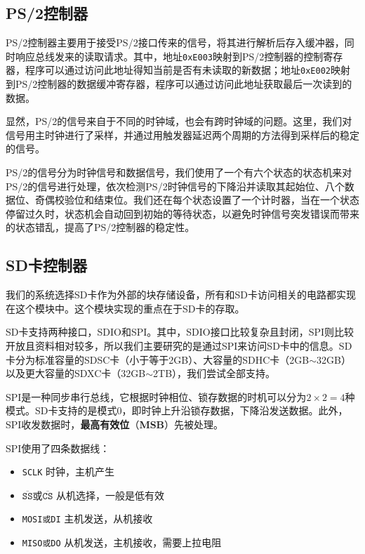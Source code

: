 \documentclass[11pt,utf8]{report}
\begin{document}
\subsection{PS/2控制器}
	PS/2控制器主要用于接受PS/2接口传来的信号，将其进行解析后存入缓冲器，同时响应总线发来的读取请求。其中，地址\texttt{0xE003}映射到PS/2控制器的控制寄存器，程序可以通过访问此地址得知当前是否有未读取的新数据；地址\texttt{0xE002}映射到PS/2控制器的数据缓冲寄存器，程序可以通过访问此地址获取最后一次读到的数据。

	显然，PS/2的信号来自于不同的时钟域，也会有跨时钟域的问题。这里，我们对信号用主时钟进行了采样，并通过用触发器延迟两个周期的方法得到采样后的稳定的信号。

	PS/2的信号分为时钟信号和数据信号，我们使用了一个有六个状态的状态机来对PS/2的信号进行处理，依次检测PS/2时钟信号的下降沿并读取其起始位、八个数据位、奇偶校验位和结束位。我们还在每个状态设置了一个计时器，当在一个状态停留过久时，状态机会自动回到初始的等待状态，以避免时钟信号突发错误而带来的状态错乱，提高了PS/2控制器的稳定性。

\subsection{SD卡控制器}
	\par 我们的系统选择SD卡作为外部的块存储设备，所有和SD卡访问相关的电路都实现在这个模块中。这个模块实现的重点在于SD卡的存取。
	
	\par SD卡支持两种接口，SDIO和SPI。其中，SDIO接口比较复杂且封闭，SPI则比较开放且资料相对较多，所以我们主要研究的是通过SPI来访问SD卡中的信息。SD卡分为标准容量的SDSC卡（小于等于2GB）、大容量的SDHC卡（2GB$\sim$32GB）以及更大容量的SDXC卡（32GB$\sim$2TB），我们尝试全部支持。
	
	\par SPI是一种同步串行总线，它根据时钟相位、锁存数据的时机可以分为$2 \times 2=4$种模式。SD卡支持的是模式0，即时钟上升沿锁存数据，下降沿发送数据。此外，SPI收发数据时，\textbf{最高有效位}（\textbf{MSB}）先被处理。
	\par SPI使用了四条数据线：
	\begin{itemize}
		\item \texttt{SCLK} 时钟，主机产生
		\item \texttt{$\mathtt{\overline{SS}}\mbox{或}\mathtt{\overline{CS}}$} 从机选择，一般是低有效
		\item \texttt{MOSI或DI} 主机发送，从机接收
		\item \texttt{MISO或DO} 从机发送，主机接收，需要上拉电阻
	\end{itemize}
	
\end{document}
